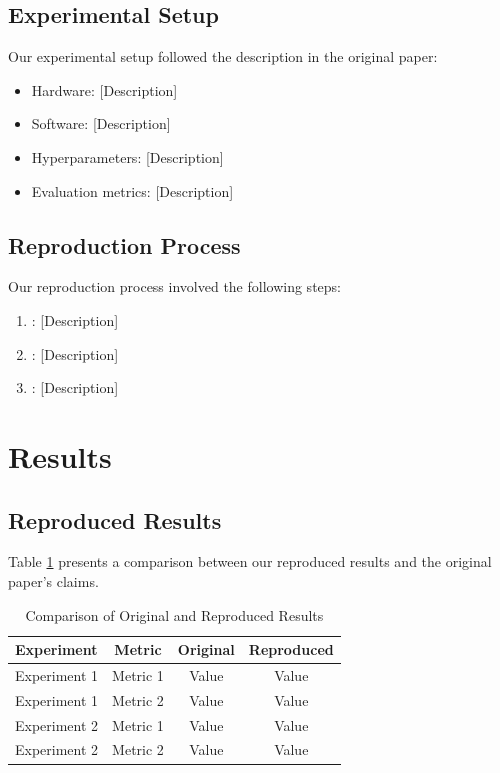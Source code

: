 \documentclass[10pt,twocolumn,letterpaper]{article}
\begin{document}
\subsection{Experimental Setup}
Our experimental setup followed the description in the original paper:

\begin{itemize}
    \item Hardware: [Description]
    \item Software: [Description]
    \item Hyperparameters: [Description]
    \item Evaluation metrics: [Description]
\end{itemize}

\subsection{Reproduction Process}
Our reproduction process involved the following steps:

\begin{enumerate}
    \item [Step 1]: [Description]
    \item [Step 2]: [Description]
    \item [Step 3]: [Description]
\end{enumerate}

\section{Results}
\label{sec:results}

\subsection{Reproduced Results}
Table \ref{tab:results_comparison} presents a comparison between our reproduced results and the original paper's claims.

\begin{table}[h]
\centering
\caption{Comparison of Original and Reproduced Results}
\label{tab:results_comparison}
\begin{tabular}{lccc}
\toprule
\textbf{Experiment} & \textbf{Metric} & \textbf{Original} & \textbf{Reproduced} \\
\midrule
Experiment 1 & Metric 1 & Value & Value \\
Experiment 1 & Metric 2 & Value & Value \\
Experiment 2 & Metric 1 & Value & Value \\
Experiment 2 & Metric 2 & Value & Value \\
\bottomrule
\end{tabular}
\end{table}
\end{document}
